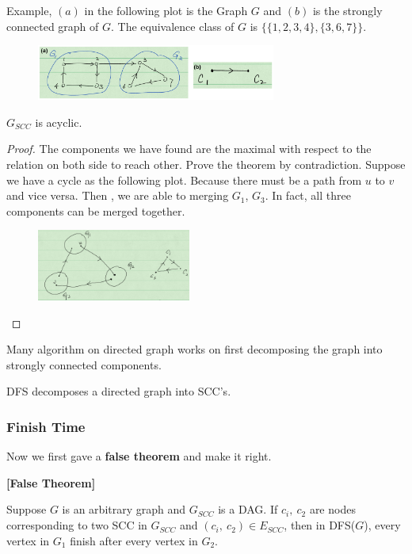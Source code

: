 \documentclass[en,hazy,blue,normal,12pt]{elegantnote}
\begin{document}
Example, $(a)$ in the following plot is the Graph $G$ and $(b)$ is the strongly 
connected graph of $G$. The equivalence class of $G$ is $\{\{1, 2, 3, 4\}, 
\{3, 6, 7\}\}$.

\begin{figure}[H]
\centering
\includegraphics[width=0.7\textwidth]{scg.png}
\end{figure}

\begin{theorem}
 $G_{SCC}$ is acyclic.
\end{theorem}

\begin{proof}
 The components we have found are the maximal with respect to the relation on 
both side to reach other. Prove the theorem by contradiction. Suppose we have a 
cycle as the following plot. Because there must be a path from $u$ to $v$ and 
vice versa. Then , we are able to merging $G_1$, $G_3$. In fact, all three 
components can be merged together.

\begin{figure}[H]
\centering
\includegraphics[width=0.45\textwidth]{scg-contradiction.png}
\end{figure}
\end{proof}

Many algorithm on directed graph works on first decomposing the graph into 
strongly connected components.

DFS decomposes a directed graph into SCC's.

\subsubsection{Finish Time}
Now we first gave a \textbf{false theorem} and make it right.
\begin{theorem}\textbf{[False Theorem]}

Suppose $G$ is an arbitrary graph and $G_{SCC}$ is a DAG. If $c_i, ~c_2$ are 
nodes corresponding to two SCC in $G_{SCC}$ and $(c_i, ~c_2) \in E_{SCC}$, then 
in DFS($G$), every vertex in $G_1$ finish after every vertex in $G_2$. 
\end{theorem}
\end{document}
